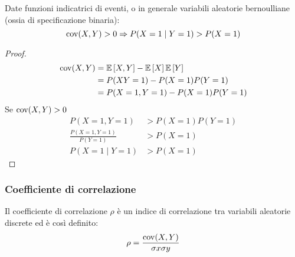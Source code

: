 \begin{prop}
	Date funzioni indicatrici di eventi, o in generale variabili aleatorie bernoulliane (ossia di specificazione binaria):
	\begin{equation*}
		\operatorname{cov}(X,Y)>0 \Rightarrow P(X=1\mid Y=1)>P(X=1)
	\end{equation*}
\end{prop}
\begin{proof}
	\begin{align*}
		\operatorname{cov}(X,Y) & = \mathbb{E}\left[ X,Y \right] - \mathbb{E}\left[ X \right]\mathbb{E}\left[ Y \right] \\
		          & = P(XY=1)-P(X=1)P(Y=1)    \\
		          & = P(X=1,Y=1)-P(X=1)P(Y=1) \\
	\end{align*}
	Se $\operatorname{cov}(X,Y)>0$
	\begin{align*}
		P(X=1,Y=1)                & > P(X=1)P(Y=1) \\
		\frac{P(X=1,Y=1)}{P(Y=1)} & > P(X=1)       \\
		P(X=1\mid Y=1)            & > P(X=1)
	\end{align*}
\end{proof}


\subsubsection{Coefficiente di correlazione}
\begin{defin}
	Il coefficiente di correlazione $\rho$ è un indice di correlazione tra variabili aleatorie discrete ed è così definito:
	\begin{equation*}
		\rho= \frac{\operatorname{cov}(X,Y)}{\sigma x\sigma y}
	\end{equation*}
\end{defin}
